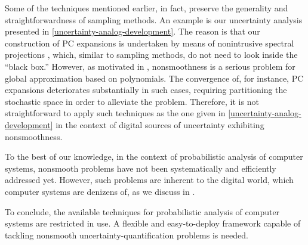Some of the techniques mentioned earlier, in fact, preserve the generality and
straightforwardness of sampling methods. An example is our uncertainty analysis
presented in \cref{uncertainty-analog-development}. The reason is that our
construction of \ac{PC} expansions is undertaken by means of nonintrusive
spectral projections \cite{xiu2010}, which, similar to sampling methods, do not
need to look inside the ``black box.'' However, as motivated in
, nonsmoothness is a serious problem for global
approximation based on polynomials. The convergence of, for instance, \ac{PC}
expansions deteriorates substantially in such cases, requiring partitioning the
stochastic space in order to alleviate the problem. Therefore, it is not
straightforward to apply such techniques as the one given in
\cref{uncertainty-analog-development} in the context of digital sources of
uncertainty exhibiting nonsmoothness.

To the best of our knowledge, in the context of probabilistic analysis of
computer systems, nonsmooth problems have not been systematically and
efficiently addressed yet. However, such problems are inherent to the digital
world, which computer systems are denizens of, as we discuss in
.

To conclude, the available techniques for probabilistic analysis of computer
systems are restricted in use. A flexible and easy-to-deploy framework capable
of tackling nonsmooth uncertainty-quantification problems is needed.
